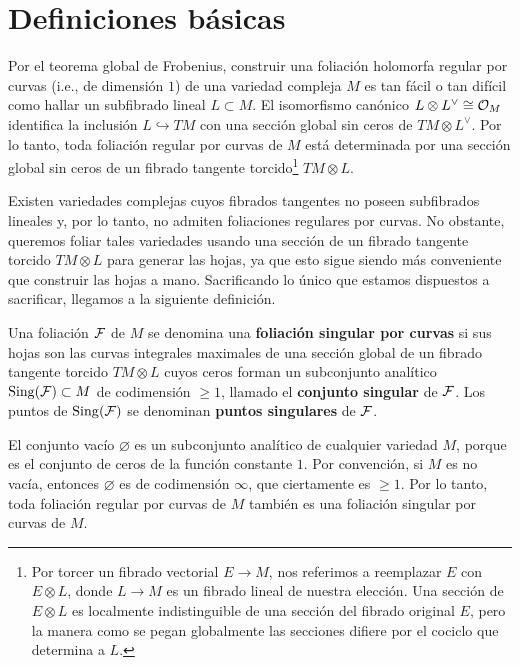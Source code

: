 \section{Definiciones básicas}

Por el teorema global de Frobenius, construir una foliación holomorfa regular por curvas (i.e., de dimensión $1$) de una variedad compleja $M$ es tan fácil o tan difícil como hallar un subfibrado lineal $L \subset M$. El isomorfismo canónico $L \otimes L^\vee \cong \mathcal O_M$ identifica la inclusión $L \hookrightarrow TM$ con una sección global sin ceros de $TM \otimes L^\vee$. Por lo tanto, toda foliación regular por curvas de $M$ está determinada por una sección global sin ceros de un fibrado tangente torcido\footnote{Por torcer un fibrado vectorial $E \to M$, nos referimos a reemplazar $E$ con $E \otimes L$, donde $L \to M$ es un fibrado lineal de nuestra elección. Una sección de $E \otimes L$ es localmente indistinguible de una sección del fibrado original $E$, pero la manera como se pegan globalmente las secciones difiere por el cociclo que determina a $L$.} $TM \otimes L$.

Existen variedades complejas cuyos fibrados tangentes no poseen subfibrados lineales y, por lo tanto, no admiten foliaciones regulares por curvas. No obstante, queremos foliar tales variedades usando una sección de un fibrado tangente torcido $TM \otimes L$ para generar las hojas, ya que esto sigue siendo más conveniente que construir las hojas a mano. Sacrificando lo único que estamos dispuestos a sacrificar, llegamos a la siguiente definición.

Una foliación $\mathcal F$ de $M$ se denomina una \textbf{foliación singular por curvas} si sus hojas son las curvas integrales maximales de una sección global de un fibrado tangente torcido $TM \otimes L$ cuyos ceros forman un subconjunto analítico $\operatorname{Sing}(\mathcal F) \subset M$ de codimensión $\ge 1$, llamado el \textbf{conjunto singular} de $\mathcal F$. Los puntos de $\operatorname{Sing}(\mathcal F)$ se denominan \textbf{puntos singulares} de $\mathcal F$.

\begin{example}
El conjunto vacío $\varnothing$ es un subconjunto analítico de cualquier variedad $M$, porque es el conjunto de ceros de la función constante $1$. Por convención, si $M$ es no vacía, entonces $\varnothing$ es de codimensión $\infty$, que ciertamente es $\ge 1$. Por lo tanto, toda foliación regular por curvas de $M$ también es una foliación singular por curvas de $M$.
\end{example}

